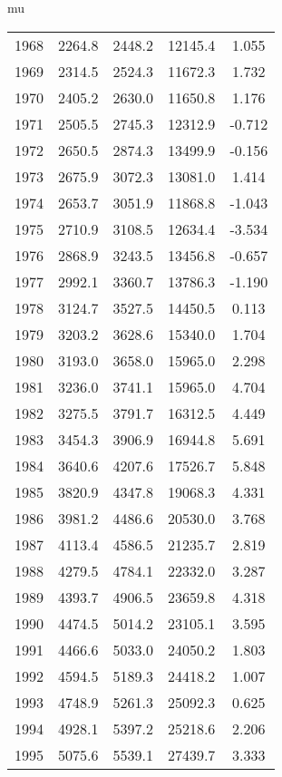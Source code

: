 mu\documentclass[10pt]{article}
\begin{document}
\begin{table}[H]
\begin{tabular}{lcccc}
        1968 & 2264.8 & 2448.2 & 12145.4 &   1.055 \\
        1969 & 2314.5 & 2524.3 & 11672.3 &   1.732 \\
        1970 & 2405.2 & 2630.0 & 11650.8 &   1.176 \\
        1971 & 2505.5 & 2745.3 & 12312.9 &  -0.712 \\
        1972 & 2650.5 & 2874.3 & 13499.9 &  -0.156 \\
        1973 & 2675.9 & 3072.3 & 13081.0 &   1.414 \\
        1974 & 2653.7 & 3051.9 & 11868.8 &  -1.043 \\
        1975 & 2710.9 & 3108.5 & 12634.4 &  -3.534 \\
        1976 & 2868.9 & 3243.5 & 13456.8 &  -0.657 \\
        1977 & 2992.1 & 3360.7 & 13786.3 &  -1.190 \\
        1978 & 3124.7 & 3527.5 & 14450.5 &   0.113 \\
        1979 & 3203.2 & 3628.6 & 15340.0 &   1.704 \\
        1980 & 3193.0 & 3658.0 & 15965.0 &   2.298 \\
        1981 & 3236.0 & 3741.1 & 15965.0 &   4.704 \\
        1982 & 3275.5 & 3791.7 & 16312.5 &   4.449 \\
        1983 & 3454.3 & 3906.9 & 16944.8 &   5.691 \\
        1984 & 3640.6 & 4207.6 & 17526.7 &   5.848 \\
        1985 & 3820.9 & 4347.8 & 19068.3 &   4.331 \\
        1986 & 3981.2 & 4486.6 & 20530.0 &   3.768 \\
        1987 & 4113.4 & 4586.5 & 21235.7 &   2.819 \\
        1988 & 4279.5 & 4784.1 & 22332.0 &   3.287 \\
        1989 & 4393.7 & 4906.5 & 23659.8 &   4.318 \\
        1990 & 4474.5 & 5014.2 & 23105.1 &   3.595 \\
        1991 & 4466.6 & 5033.0 & 24050.2 &   1.803 \\
        1992 & 4594.5 & 5189.3 & 24418.2 &   1.007 \\
        1993 & 4748.9 & 5261.3 & 25092.3 &   0.625 \\
        1994 & 4928.1 & 5397.2 & 25218.6 &   2.206 \\
        1995 & 5075.6 & 5539.1 & 27439.7 &   3.333 \\

\end{tabular}
\end{table}
\end{document}

